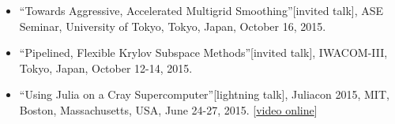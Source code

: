 \documentclass[12pt]{article}
\begin{document}
\begin{itemize}
  \item ``Towards Aggressive, Accelerated Multigrid Smoothing''[invited talk], ASE Seminar, University of Tokyo, Tokyo, Japan, October 16, 2015.
  \item ``Pipelined, Flexible Krylov Subspace Methods''[invited talk], IWACOM-III, Tokyo, Japan, October 12-14, 2015.
  \item ``Using Julia on a Cray Supercomputer''[lightning talk], Juliacon 2015, MIT, Boston, Massachusetts, USA, June 24-27, 2015. [\href{https://www.youtube.com/watch?v=NwyKz2KLdtY}{video online}]
\end{itemize}

%
\end{document}
